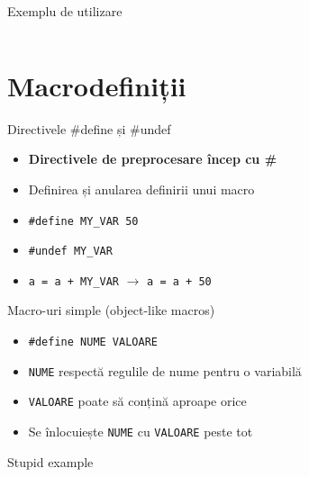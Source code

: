 \documentclass{beamer}
\begin{document}
\begin{frame}{Exemplu de utilizare}
	\begin{columns}
		\begin{column}[l]{0.5\textwidth}
			
		\end{column}
		\begin{column}[l]{0.4\textwidth}
			
		\end{column}
	\end{columns}
\end{frame}

\section{Macrodefiniții}

\frame{\tableofcontents[currentsection]}

\begin{frame}{Directivele \#define și \#undef}
	\begin{itemize}
		\item \textbf{Directivele de preprocesare încep cu \textbf{\#}}
		\item Definirea și anularea definirii unui macro
		\item \texttt{\#define MY\_VAR  50}
		\item \texttt{\#undef MY\_VAR}
		\item \texttt{a = a + MY\_VAR} $\rightarrow$ \texttt{a = a + 50}
	\end{itemize}
\end{frame}

\begin{frame}{Macro-uri simple (object-like macros)}
	\begin{itemize}
		\item \texttt{\#define NUME	VALOARE}
		\item \texttt{NUME} respectă regulile de nume pentru o variabilă
		\item \texttt{VALOARE} poate să conțină aproape orice
		\item Se înlocuiește \texttt{NUME} cu \texttt{VALOARE} peste tot
	\end{itemize}
\end{frame}

\begin{frame}{Stupid example}
	\begin{columns}
		\begin{column}[l]{0.4\textwidth}
			
		\end{column}
		\begin{column}[l]{0.4\textwidth}
			
		\end{column}
	\end{columns}
\end{frame}
\end{document}

